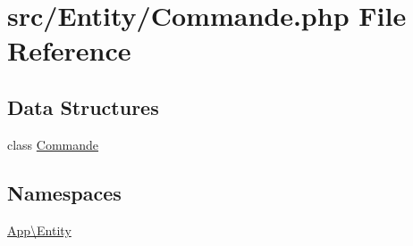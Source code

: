 \hypertarget{_commande_8php}{}\section{src/\+Entity/\+Commande.php File Reference}
\label{_commande_8php}
\subsection*{Data Structures}
\begin{DoxyCompactItemize}
\item 
class \mbox{\hyperlink{class_app_1_1_entity_1_1_commande}{Commande}}
\end{DoxyCompactItemize}
\subsection*{Namespaces}
\begin{DoxyCompactItemize}
\item 
 \mbox{\hyperlink{namespace_app_1_1_entity}{App\textbackslash{}\+Entity}}
\end{DoxyCompactItemize}

